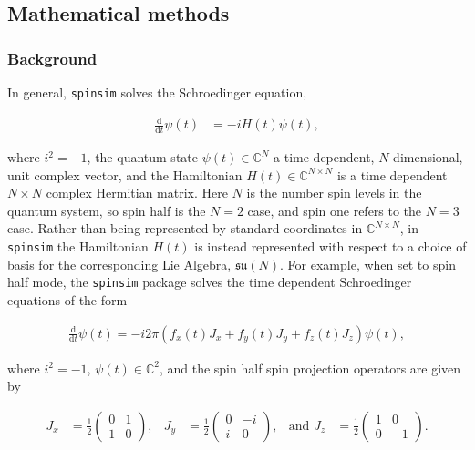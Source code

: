 \documentclass{jors}
\begin{document}
	\subsection*{Mathematical methods}
		\subsubsection*{Background}
			In general, \texttt{spinsim} solves the Schroedinger equation,

			\begin{align}
				\frac{\mathrm{d}}{\mathrm{d}t}\psi(t) &= -iH(t)\psi(t),
			\end{align}

			where \(i^2 = -1\), the quantum state \(\psi(t) \in \mathbb{C}^N\) a time dependent, \(N\) dimensional, unit complex vector, and the Hamiltonian \(H(t) \in \mathbb{C}^{N \times N}\) is a time dependent \(N \times N\) complex Hermitian matrix. Here \(N\) is the number spin levels in the quantum system, so spin half is the \(N = 2\) case, and spin one refers to the \(N = 3\) case. Rather than being represented by standard coordinates in \(\mathbb{C}^{N \times N}\), in \texttt{spinsim} the Hamiltonian \(H(t)\) is instead represented with respect to a choice of basis for the corresponding Lie Algebra, \(\mathfrak{su}(N)\). For example, when set to spin half mode, the \texttt{spinsim} package solves the time dependent Schroedinger equations of the form

			\begin{align}
				\frac{\mathrm{d}}{\mathrm{d}t}\psi(t) = -i 2\pi (f_x(t) J_x + f_y(t) J_y + f_z(t) J_z) \psi(t),
			\end{align}

			where \(i^2 = -1\), \(\psi(t) \in \mathbb{C}^2\), and the spin half spin projection operators are given by

			\begin{align}
				J_x &= \frac12\begin{pmatrix}
					0 & 1 \\
					1 & 0
				\end{pmatrix},
				&J_y &= \frac12\begin{pmatrix}
					0 & -i \\
					i &  0
				\end{pmatrix},
				&\textrm{and }J_z &= \frac12\begin{pmatrix}
					1 &  0 \\
					0 & -1
				\end{pmatrix}.
			\end{align}
\end{document}
